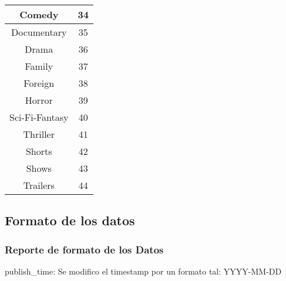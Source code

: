 \begin{center}
\begin{tabular}{||c | c||}
                    Comedy & 34 \\
                    \hline
                    Documentary & 35 \\
                    \hline
                    Drama & 36 \\
                    \hline
                    Family & 37 \\
                    \hline
                    Foreign & 38 \\
                    \hline
                    Horror & 39 \\
                    \hline
                    Sci-Fi-Fantasy & 40 \\
                    \hline
                    Thriller & 41 \\
                    \hline
                    Shorts & 42 \\
                    \hline
                    Shows & 43 \\
                    \hline
                    Trailers & 44 \\
                    \hline
                \end{tabular}
            \end{center}

\subsection{Formato de los datos}
    \subsubsection{Reporte de formato de los Datos}
        publish\_time: Se modifico el timestamp por un formato tal: YYYY-MM-DD
